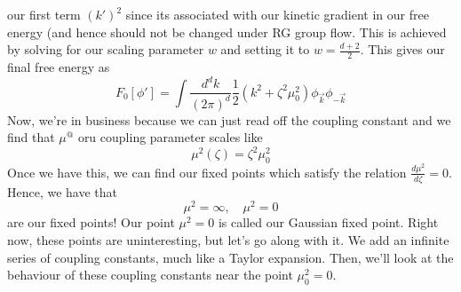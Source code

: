 our first term $ ( k ' ) ^2  $ since its associated with 
our kinetic gradient in our free energy (and hence should not be 
changed under RG group flow. This is achieved by solving
for our scaling parameter $ w $ and setting it to 
$ w = \frac{ d + 2 }{ 2 }$. This gives our final free energy as
\[
	F _ 0 [ \phi ' ] = 
	\int \frac{ d ^ d k  }{( 2 \pi ) ^ d  } 
	\frac{1}{2 } ( k ^ 2  + \zeta ^ 2 \mu _ 0 ^ 2 ) \phi _{ \vec{k} } \phi _{  - \vec{k} } 
\]  Now, we're in business because we 
can just read off the coupling constant and
we find that $ \mu ^ @ $  oru
coupling parameter scales like 
\[
 \mu ^ 2 ( \zeta ) = \zeta ^ 2 \mu ^ 2 _ 0 
\] Once we have this, we can find 
our fixed points which satisfy the relation 
$ \frac{ d \mu ^ 2  }{ d  \zeta} =0  $. Hence, we 
have that 
\[
 \mu ^ 2 = \infty, \quad \mu ^ 2 = 0  
\] are our fixed points!
Our point $ \mu ^ 2  = 0 $ is called our Gaussian 
fixed point. Right now, these
points are uninteresting, but let's go along with it. 
We add an infinite series of coupling constants, much 
like a Taylor expansion. Then,
we'll look at the behaviour of these coupling 
constants near the point $ \mu _ 0 ^ 2 = 0 $. 



